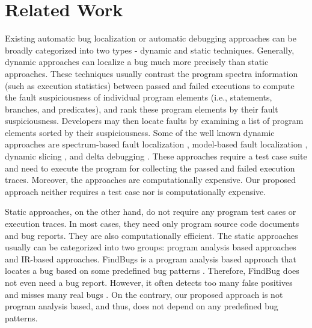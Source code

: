 \documentclass[sigconf,review,anonymous]{acmart}
\begin{document}
\section{Related Work}\label{relatedwork}
Existing automatic bug localization or automatic debugging approaches can be broadly categorized into two types - dynamic and static techniques. Generally, dynamic approaches can localize a bug much more precisely than static approaches. These techniques usually contrast the program spectra information (such as execution statistics) between passed and failed executions to compute the fault suspiciousness of individual program elements (i.e., statements, branches, and predicates), and rank these program elements by their fault suspiciousness. Developers may then locate faults by examining a list of program elements sorted by their suspiciousness. Some of the well known dynamic approaches are spectrum-based fault localization \cite{Abreu,Jones,Lucia,SahaFault}, model-based fault localization \cite{Feldman,Mayer}, dynamic slicing \cite{Zhang:2005}, and delta debugging \cite{Zeller:2002}. These approaches require a test case suite and need to execute the program for collecting the passed and failed execution traces. Moreover, the approaches are computationally expensive. 
Our proposed approach neither requires a test case nor is computationally expensive.


Static approaches, on the other hand, do not require any program test cases or execution traces. In most cases, they need only program source code documents and bug reports. They are also computationally efficient. The static approaches usually can be categorized into two groups: program analysis based approaches and IR-based approaches. FindBugs is a program analysis based approach that locates a bug based on some predefined bug patterns \cite{FindBug}. 
Therefore, FindBug does not even need a bug report. However, it often detects too many false positives and misses many real bugs \cite{Tang}. 
On the contrary, our proposed approach is not program analysis based, and thus, does not depend on any predefined bug patterns.
\end{document}
